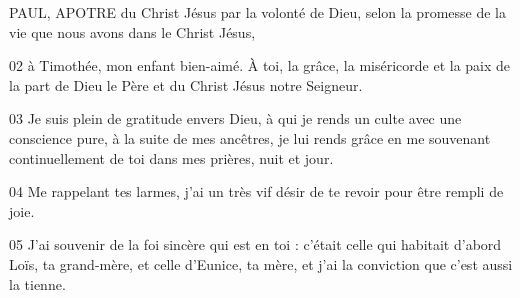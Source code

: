 PAUL, APOTRE du Christ Jésus par la volonté de Dieu, selon la promesse de la vie que nous avons dans le Christ Jésus,

02 à Timothée, mon enfant bien-aimé. À toi, la grâce, la miséricorde et la paix de la part de Dieu le Père et du Christ Jésus notre Seigneur.

03 Je suis plein de gratitude envers Dieu, à qui je rends un culte avec une conscience pure, à la suite de mes ancêtres, je lui rends grâce en me souvenant continuellement de toi dans mes prières, nuit et jour.

04 Me rappelant tes larmes, j’ai un très vif désir de te revoir pour être rempli de joie.

05 J’ai souvenir de la foi sincère qui est en toi : c’était celle qui habitait d’abord Loïs, ta grand-mère, et celle d’Eunice, ta mère, et j’ai la conviction que c’est aussi la tienne.

